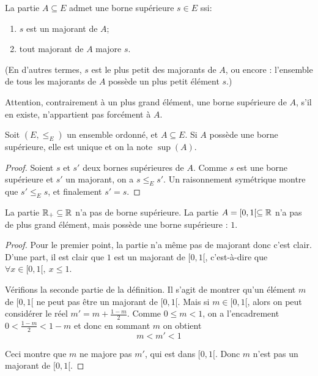 \begin{definition}
 La partie $A\subseteq E$ admet une borne supérieure $s\in E$ ssi:
\begin{enumerate}
\item $s$ est un majorant de $A$;
\item tout majorant de $A$ majore $s$.
\end{enumerate}
(En d'autres termes, $s$ est le plus petit des majorants de $A$, ou encore : l'ensemble de tous les majorants de $A$ possède un plus petit élément $s$.)
\end{definition}

Attention, contrairement à un plus grand élément, une  borne supérieure de $A$, s'il en existe, n'appartient pas forcément à $A$. 

\begin{proposition}
Soit $(E,\leq_E)$ un ensemble ordonné, et $A\subseteq E$. Si $A$ possède une borne supérieure, elle est unique et on la note $\sup(A)$.
\end{proposition}
\begin{proof}
Soient $s$ et $s'$ deux bornes supérieures de $A$. Comme $s$ est une borne supérieure et $s'$ un majorant, on a $s\leq_E s'$. Un raisonnement symétrique montre que  $s'\leq_E s$, et finalement $s'=s$.
\end{proof}

\begin{exemple}
La partie $\mathbb{R}_+ \subseteq \mathbb{R}$ n'a pas de borne supérieure. 
La partie $A=[0,1[ \subseteq \mathbb{R}$ n'a pas de plus grand élément, mais possède une borne supérieure : $1$.
\end{exemple}
\begin{proof} Pour le premier point, la partie n'a même pas de majorant donc c'est clair. 
D'une part, il est clair que $1$ est un majorant de $[0,1[$, c'est-à-dire que $\forall x\in [0,1[, \: x\leq 1$.

Vérifions la seconde partie de la définition.  Il s'agit de montrer qu'un élément $m$ de $[0,1[$ ne peut pas être un majorant de $[0,1[$. Mais si $m \in [0,1[$, alors on peut considérer le réel $m'=m+\frac{1-m}{2}$. Comme $0\leq m< 1$, on a l'encadrement $0< \frac{1-m}{2} < 1-m$ et donc en sommant $m$ on obtient
\[
m< m' < 1
\]
\begin{center}
\end{center}
Ceci montre que $m$ ne majore pas $m'$, qui est dans $[0,1[$. Donc $m$ n'est pas un majorant de $[0,1[$.
\end{proof}

